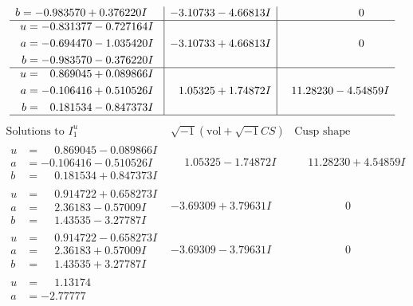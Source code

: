 \documentclass[1p]{elsarticle_modified}
\theoremstyle{definition}
\newcommand{\I}{\sqrt{-1}}
\begin{document}
$$\begin{array}{c|c|c}
\begin{aligned}
b &= -0.983570 + 0.376220 I\end{aligned}
 & -3.10733 - 4.66813 I & \phantom{-0.000000 } 0 \\ \hline\begin{aligned}
u &= -0.831377 - 0.727164 I \\
a &= -0.694470 - 1.035420 I \\
b &= -0.983570 - 0.376220 I\end{aligned}
 & -3.10733 + 4.66813 I & \phantom{-0.000000 } 0 \\ \hline\begin{aligned}
u &= \phantom{-}0.869045 + 0.089866 I \\
a &= -0.106416 + 0.510526 I \\
b &= \phantom{-}0.181534 - 0.847373 I\end{aligned}
 & \phantom{-}1.05325 + 1.74872 I & \phantom{-}11.28230 - 4.54859 I\\
 \hline 
 \end{array}$$\newpage$$\begin{array}{c|c|c}  
\text{Solutions to }I^u_{1}& \I (\text{vol} + \sqrt{-1}CS) & \text{Cusp shape}\\
 \hline 
\begin{aligned}
u &= \phantom{-}0.869045 - 0.089866 I \\
a &= -0.106416 - 0.510526 I \\
b &= \phantom{-}0.181534 + 0.847373 I\end{aligned}
 & \phantom{-}1.05325 - 1.74872 I & \phantom{-}11.28230 + 4.54859 I \\ \hline\begin{aligned}
u &= \phantom{-}0.914722 + 0.658273 I \\
a &= \phantom{-}2.36183 - 0.57009 I \\
b &= \phantom{-}1.43535 - 3.27787 I\end{aligned}
 & -3.69309 + 3.79631 I & \phantom{-0.000000 } 0 \\ \hline\begin{aligned}
u &= \phantom{-}0.914722 - 0.658273 I \\
a &= \phantom{-}2.36183 + 0.57009 I \\
b &= \phantom{-}1.43535 + 3.27787 I\end{aligned}
 & -3.69309 - 3.79631 I & \phantom{-0.000000 } 0 \\ \hline\begin{aligned}
u &= \phantom{-}1.13174\phantom{ +0.000000I} \\
a &= -2.77777\phantom{ +0.000000I} \\

\end{aligned}
\end{array}$$
\end{document}
